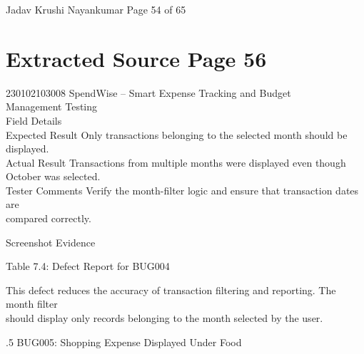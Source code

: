 \documentclass[12pt,a4paper]{report}
\begin{document}
\smallskip

\smallskip

\smallskip

\smallskip
Jadav Krushi Nayankumar                                                        Page 54 of 65\\ 

\clearpage
\section*{Extracted Source Page 56}
230102103008                          SpendWise – Smart Expense Tracking and Budget\\ 
Management Testing\\ 

\smallskip
Field                 Details\\ 
Expected Result       Only transactions belonging to the selected month should be\\ 
displayed.\\ 
Actual Result         Transactions from multiple months were displayed even though\\ 
October was selected.\\ 
Tester Comments       Verify the month-filter logic and ensure that transaction dates are\\ 
compared correctly.\\ 

\smallskip

\smallskip

\smallskip

\smallskip
Screenshot Evidence\\ 

\smallskip

\smallskip

\smallskip

\smallskip
Table 7.4: Defect Report for BUG004\\ 

\smallskip

\smallskip
This defect reduces the accuracy of transaction filtering and reporting. The month filter\\ 
should display only records belonging to the month selected by the user.\\ 

\smallskip

.5 BUG005: Shopping Expense Displayed Under Food\\ 

\smallskip
\end{document}
